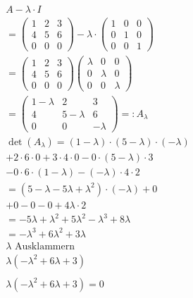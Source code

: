 \begin{align*}
    A - \lambda \cdot I \\
    = \begin{pmatrix}
        1 & 2 & 3 \\ 
        4 & 5 & 6 \\ 
        0 & 0 & 0
    \end{pmatrix} - \lambda \cdot \begin{pmatrix}
        1 & 0 & 0 \\
        0 & 1 & 0 \\
        0 & 0 & 1
    \end{pmatrix} \\
    = \begin{pmatrix}
        1 & 2 & 3 \\ 
        4 & 5 & 6 \\ 
        0 & 0 & 0
    \end{pmatrix}\begin{pmatrix}
        \lambda & 0 & 0 \\
        0 & \lambda & 0 \\
        0 & 0 & \lambda
    \end{pmatrix} \\
    = \begin{pmatrix}
        1 - \lambda & 2 & 3 \\
        4 & 5 - \lambda & 6 \\
        0 & 0 & -\lambda
    \end{pmatrix} =: A_\lambda \\
    \det(A_\lambda) = (1 - \lambda) \cdot (5 - \lambda) \cdot (-\lambda) \\
        + 2 \cdot 6 \cdot 0  + 3 \cdot 4 \cdot 0 - 0 \cdot (5 - \lambda) \cdot 3\\
        - 0 \cdot 6 \cdot (1 - \lambda) - (-\lambda) \cdot 4 \cdot 2 \\
    = (5 - \lambda - 5\lambda + \lambda^2) \cdot (-\lambda) + 0 \\
        + 0 - 0 - 0 + 4\lambda \cdot 2 \\
    = -5\lambda +\lambda^2 +5\lambda^2 -\lambda^3 + 8\lambda \\
    = -\lambda^3 + 6\lambda^2 + 3\lambda \\
    \text{$\lambda$ Ausklammern} \\
    \lambda (-\lambda^2 + 6\lambda + 3) \\\\
    \lambda (-\lambda^2 + 6\lambda + 3) = 0\\

\end{align*}
